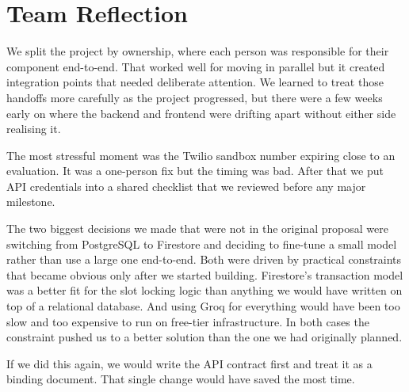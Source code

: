 \section{Team Reflection}
\label{sec:reflect-team}

We split the project by ownership, where each person was responsible for their component end-to-end. That worked well for moving in parallel but it created integration points that needed deliberate attention. We learned to treat those handoffs more carefully as the project progressed, but there were a few weeks early on where the backend and frontend were drifting apart without either side realising it.

The most stressful moment was the Twilio sandbox number expiring close to an evaluation. It was a one-person fix but the timing was bad. After that we put API credentials into a shared checklist that we reviewed before any major milestone.

The two biggest decisions we made that were not in the original proposal were switching from PostgreSQL to Firestore and deciding to fine-tune a small model rather than use a large one end-to-end. Both were driven by practical constraints that became obvious only after we started building. Firestore's transaction model was a better fit for the slot locking logic than anything we would have written on top of a relational database. And using Groq for everything would have been too slow and too expensive to run on free-tier infrastructure. In both cases the constraint pushed us to a better solution than the one we had originally planned.

If we did this again, we would write the API contract first and treat it as a binding document. That single change would have saved the most time.

